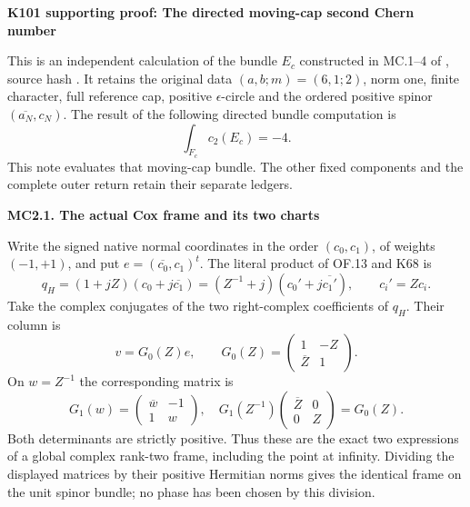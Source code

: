 \par\bigskip\noindent\textbf{K101 supporting proof: The directed moving-cap second Chern number}\par\nobreak
This is an independent calculation of the bundle \(E_c\) constructed in
MC.1--4 of , source hash
.
It retains the original data \((a,b;m)=(6,1;2)\), norm one, finite
character, full reference cap, positive \(\epsilon\)-circle and the ordered
positive spinor \((\overline{a_N},c_N)\). The result of the following
directed bundle computation is
\[
                         \int_{F_c}c_2(E_c)=-4.          \tag{MC2.1}
\]
This note evaluates that moving-cap bundle. The other fixed components
and the complete outer return retain their separate ledgers.

\par

\medskip\noindent\textbf{MC2.1. The actual Cox frame and its two charts}

\par\nobreak

Write the signed native normal coordinates in the order \((c_0,c_1)\),
of weights \((-1,+1)\), and put \(e=(\overline{c_0},c_1)^t\).
The literal product of OF.13 and K68 is
\[
 q_H=(1+jZ)(c_0+j\overline{c_1})
    =(Z^{-1}+j)(c_0'+j\overline{c_1'}),\qquad
 c_i'=Zc_i.                                             \tag{MC2.2}
\]
Take the complex conjugates of the two right-complex coefficients
of \(q_H\). Their column is
\[
 v=G_0(Z)e,\qquad
 G_0(Z)=\begin{pmatrix}1&-Z\\\overline Z&1\end{pmatrix}.
                                                               \tag{MC2.3}
\]
On \(w=Z^{-1}\) the corresponding matrix is
\[
 G_1(w)=\begin{pmatrix}\overline w&-1\\1&w\end{pmatrix},
 \quad
 G_1(Z^{-1})\begin{pmatrix}\overline Z&0\\0&Z\end{pmatrix}
       =G_0(Z).                                          \tag{MC2.4}
\]
Both determinants are strictly positive. Thus these are the exact
two expressions of a global complex rank-two frame, including the
point at infinity. Dividing the displayed matrices by their positive
Hermitian norms gives the identical frame on the unit spinor bundle;
no phase has been chosen by this division.

